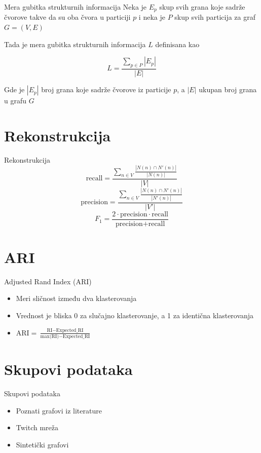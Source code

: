 \documentclass{beamer}
\begin{document}
\begin{frame}{Mera gubitka strukturnih informacija}
    Neka je $ E_p $ skup svih grana koje sadrže čvorove takve da su oba čvora u particiji $ p $  i neka je $ P $ skup svih particija za graf $ G = (V, E) $

    Tada je mera gubitka strukturnih informacija $ L $ definisana kao

    $$ L = \frac{\sum_{p \in P} |E_p|}{|E|} $$

    Gde je $ |E_p| $ broj grana koje sadrže čvorove iz particije $ p $, a $ |E| $ ukupan broj grana u grafu $ G $
\end{frame}

\section{Rekonstrukcija}
\begin{frame}{Rekonstrukcija}
    $$ \text{recall} = \frac{\sum_{n \in V} \frac{|N(n) \cap N'(n)|}{|N(n)|}}{|V|} $$
    $$ \text{precision} = \frac{\sum_{n \in V} \frac{|N(n) \cap N'(n)|}{|N'(n)|}}{|V'|} $$
    $$ F_1 = \frac{2 \cdot \text{precision} \cdot \text{recall}}{\text{precision} + \text{recall}} $$
\end{frame}


\section{ARI}
\begin{frame}{Adjusted Rand Index (ARI)}
    \begin{itemize}
        \item Meri sličnost između dva klasterovanja
        \item Vrednost je bliska 0 za slučajno klasterovanje, a 1 za identična klasterovanja
        \item $ \text{ARI} = \frac{\text{RI} - \text{Expected\_RI}}{\text{max(RI)} - \text{Expected\_RI}} $
    \end{itemize}
\end{frame}

\section{Skupovi podataka}
\begin{frame}{Skupovi podataka}
    \begin{itemize}
        \item Poznati grafovi iz literature 
        \item Twitch mreža
        \item Sintetički grafovi 
    \end{itemize}
\end{frame}
\end{document}
